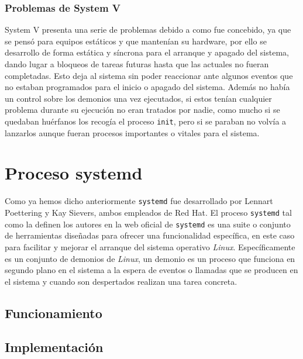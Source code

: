 \subsubsection{Problemas de System V}
System V presenta una serie de problemas debido a como fue concebido, ya que se pensó para equipos estáticos y que mantenían su hardware, por ello se desarrollo de forma estática y síncrona para el arranque y apagado del sistema, dando lugar a bloqueos de tareas futuras hasta que las actuales no fueran completadas. Esto deja al sistema sin poder reaccionar ante algunos eventos que no estaban programados para el inicio o apagado del sistema. Además no había un control sobre los demonios una vez ejecutados, si estos tenían cualquier problema durante su ejecución no eran tratados por nadie, como mucho si se quedaban huérfanos los recogía el proceso \texttt{init}, pero si se paraban no volvía a lanzarlos aunque fueran procesos importantes o vitales para el sistema.

\section{Proceso systemd} %

Como ya hemos dicho anteriormente \texttt{systemd} fue desarrollado por Lennart Poettering y Kay Sievers, ambos empleados de Red Hat.
El proceso \texttt{systemd} tal como la definen los autores en la web oficial de \texttt{systemd} \cite{systemd} es una suite o conjunto de herramientas diseñadas para ofrecer una funcionalidad específica, en este caso para facilitar y mejorar el arranque del sistema operativo \textit{Linux}. Específicamente es un conjunto de demonios de \textit{Linux}, un demonio \cite{daemons} es un proceso que funciona en segundo plano en el sistema a la espera de eventos o llamadas que se producen en el sistema y cuando son despertados realizan una tarea concreta. 






\subsection{Funcionamiento}

\subsection{Implementación}

